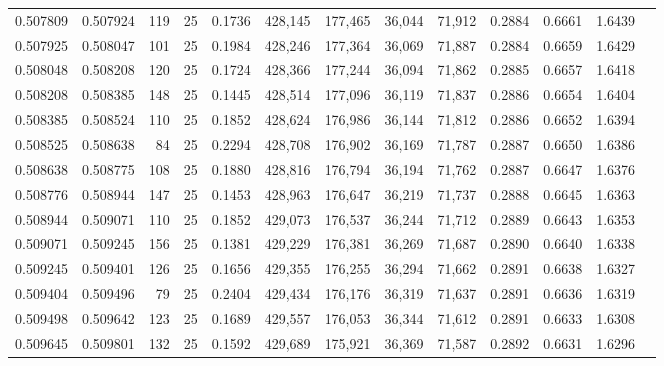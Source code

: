 \begin{tabular}{rrrrrrrrrrrrr}
0.507809 & 0.507924 &   119 &  25 &                                     0.1736 & 428,145 & 177,465 &  36,044 &  71,912 & 0.2884 & 0.6661 & 1.6439 \\
0.507925 & 0.508047 &   101 &  25 &                                     0.1984 & 428,246 & 177,364 &  36,069 &  71,887 & 0.2884 & 0.6659 & 1.6429 \\
0.508048 & 0.508208 &   120 &  25 &                                     0.1724 & 428,366 & 177,244 &  36,094 &  71,862 & 0.2885 & 0.6657 & 1.6418 \\
0.508208 & 0.508385 &   148 &  25 &                                     0.1445 & 428,514 & 177,096 &  36,119 &  71,837 & 0.2886 & 0.6654 & 1.6404 \\
0.508385 & 0.508524 &   110 &  25 &                                     0.1852 & 428,624 & 176,986 &  36,144 &  71,812 & 0.2886 & 0.6652 & 1.6394 \\
0.508525 & 0.508638 &    84 &  25 &                                     0.2294 & 428,708 & 176,902 &  36,169 &  71,787 & 0.2887 & 0.6650 & 1.6386 \\
0.508638 & 0.508775 &   108 &  25 &                                     0.1880 & 428,816 & 176,794 &  36,194 &  71,762 & 0.2887 & 0.6647 & 1.6376 \\
0.508776 & 0.508944 &   147 &  25 &                                     0.1453 & 428,963 & 176,647 &  36,219 &  71,737 & 0.2888 & 0.6645 & 1.6363 \\
0.508944 & 0.509071 &   110 &  25 &                                     0.1852 & 429,073 & 176,537 &  36,244 &  71,712 & 0.2889 & 0.6643 & 1.6353 \\
0.509071 & 0.509245 &   156 &  25 &                                     0.1381 & 429,229 & 176,381 &  36,269 &  71,687 & 0.2890 & 0.6640 & 1.6338 \\
0.509245 & 0.509401 &   126 &  25 &                                     0.1656 & 429,355 & 176,255 &  36,294 &  71,662 & 0.2891 & 0.6638 & 1.6327 \\
0.509404 & 0.509496 &    79 &  25 &                                     0.2404 & 429,434 & 176,176 &  36,319 &  71,637 & 0.2891 & 0.6636 & 1.6319 \\
0.509498 & 0.509642 &   123 &  25 &                                     0.1689 & 429,557 & 176,053 &  36,344 &  71,612 & 0.2891 & 0.6633 & 1.6308 \\
0.509645 & 0.509801 &   132 &  25 &                                     0.1592 & 429,689 & 175,921 &  36,369 &  71,587 & 0.2892 & 0.6631 & 1.6296 \\

\end{tabular}
